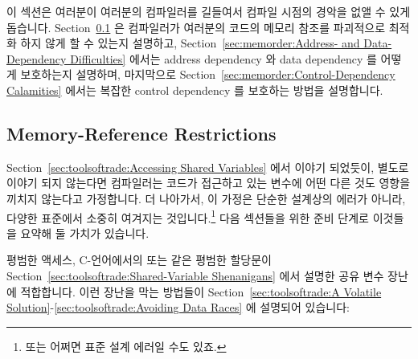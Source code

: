 이 섹션은 여러분이 여러분의 컴파일러를 길들여서 컴파일 시점의 경악을 없앨 수
있게 돕습니다.
Section~\ref{sec:memorder:Memory-Reference Restrictions}
은 컴파일러가 여러분의 코드의 메모리 참조를 파괴적으로 최적화 하지 않게 할 수
있는지 설명하고,
Section~\ref{sec:memorder:Address- and Data-Dependency Difficulties}
에서는 address dependency 와 data dependency 를 어떻게 보호하는지 설명하며,
마지막으로
Section~\ref{sec:memorder:Control-Dependency Calamities}
에서는 복잡한 control dependency 를 보호하는 방법을 설명합니다.

\subsection{Memory-Reference Restrictions}
\label{sec:memorder:Memory-Reference Restrictions}

Section~\ref{sec:toolsoftrade:Accessing Shared Variables} 에서 이야기 되었듯이,
별도로 이야기 되지 않는다면 컴파일러는 코드가 접근하고 있는 변수에 어떤 다른
것도 영향을 끼치지 않는다고 가정합니다.
더 나아가서, 이 가정은 단순한 설계상의 에러가 아니라, 다양한 표준에서 소중히
여겨지는 것입니다.\footnote{
	또는 어쩌면 표준 설계 에러일 수도 있죠.}
다음 섹션들을 위한 준비 단계로 이것들을 요약해 둘 가치가 있습니다.

평범한 액세스, C-언어에서의  또는  같은 평범한 할당문이
Section~\ref{sec:toolsoftrade:Shared-Variable Shenanigans} 에서 설명한 공유
변수 장난에 적합합니다.
이런 장난을 막는 방법들이
Section~\ref{sec:toolsoftrade:A Volatile Solution}-\ref{sec:toolsoftrade:Avoiding Data Races}
에 설명되어 있습니다:
\iffalse

